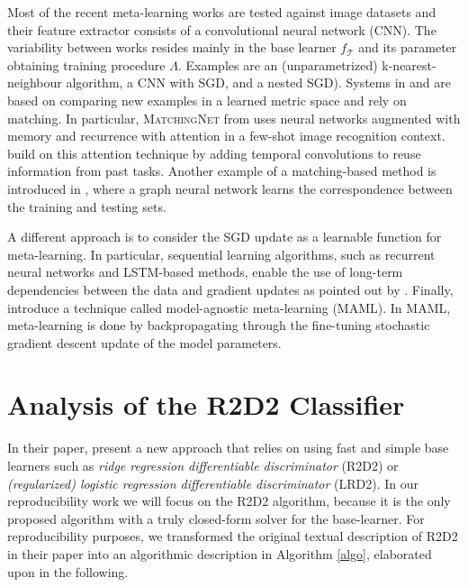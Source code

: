 Most of the recent meta-learning works are tested against image datasets and their feature extractor consists of a convolutional neural network (CNN). The variability between works resides mainly in the base learner $f_\mathcal{T}$ and its parameter obtaining training procedure $\Lambda$. Examples are an (unparametrized) k-nearest-neighbour algorithm\supercite{vinyals}, a CNN with SGD\supercite{mishra}, and a nested SGD\supercite{finn}). Systems in \citet{vinyals} and \citet{snell} are based on comparing new examples in a learned metric space and rely on matching. In particular, \textsc{MatchingNet} from \citet{vinyals} uses neural networks augmented with memory and recurrence with attention in a few-shot image recognition context. \citet{mishra} build on this attention technique by adding temporal convolutions to reuse information from past tasks. Another example of a matching-based method is introduced in \citet{garcia}, where a graph neural network learns the correspondence between the training and testing sets.

A different approach is to consider the SGD update as a learnable function for meta-learning. In particular, sequential learning algorithms, such as recurrent neural networks and LSTM-based methods, enable the use of long-term dependencies between the data and gradient updates as pointed out by \citet{ravi}. Finally, \citet{finn} introduce a technique called model-agnostic meta-learning (MAML). In MAML, meta-learning is done by backpropagating through the fine-tuning stochastic gradient descent update of the model parameters.

\section{Analysis of the R2D2 Classifier}
\label{Anal}
In their paper, \citet{R2D2} present a new approach that relies on using fast and simple base learners such as \textit{ridge regression differentiable discriminator} (R2D2) or \textit{(regularized) logistic regression differentiable discriminator} (LRD2). In our reproducibility work we will focus on the R2D2 algorithm, because it is the only proposed algorithm with a truly closed-form solver for the base-learner. For reproducibility purposes, we transformed the original textual description of R2D2 in their paper into an algorithmic description in Algorithm \ref{algo}, elaborated upon in the following.

